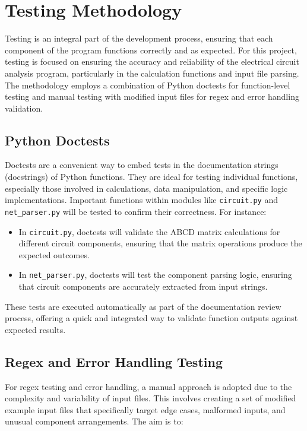 \documentclass[conference]{IEEEtran}
\begin{document}
\section{Testing Methodology}

Testing is an integral part of the development process, ensuring that each component of the program functions correctly and as expected. For this project, testing is focused on ensuring the accuracy and reliability of the electrical circuit analysis program, particularly in the calculation functions and input file parsing. The methodology employs a combination of Python doctests for function-level testing and manual testing with modified input files for regex and error handling validation.

\subsection{Python Doctests}
Doctests are a convenient way to embed tests in the documentation strings (docstrings) of Python functions. They are ideal for testing individual functions, especially those involved in calculations, data manipulation, and specific logic implementations. Important functions within modules like \texttt{circuit.py} and \texttt{net\_parser.py} will be tested to confirm their correctness. For instance:

\begin{itemize}
    \item In \texttt{circuit.py}, doctests will validate the ABCD matrix calculations for different circuit components, ensuring that the matrix operations produce the expected outcomes.
    \item In \texttt{net\_parser.py}, doctests will test the component parsing logic, ensuring that circuit components are accurately extracted from input strings.
\end{itemize}

These tests are executed automatically as part of the documentation review process, offering a quick and integrated way to validate function outputs against expected results.

\subsection{Regex and Error Handling Testing}
For regex testing and error handling, a manual approach is adopted due to the complexity and variability of input files. This involves creating a set of modified example input files that specifically target edge cases, malformed inputs, and unusual component arrangements. The aim is to:
\end{document}
